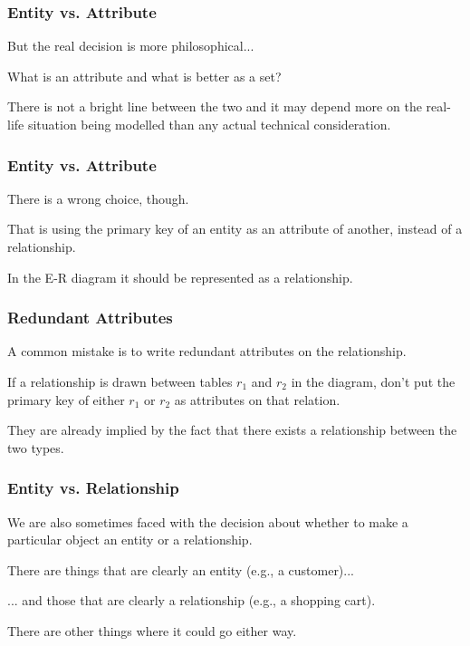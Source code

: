 \begin{frame}
\frametitle{Entity vs. Attribute}

But the real decision is more philosophical... 

What is an attribute and what is better as a set? 

There is not a bright line between the two and it may depend more on the real-life situation being modelled than any actual technical consideration.


\end{frame}



\begin{frame}
\frametitle{Entity vs. Attribute}

There is a wrong choice, though. 

That is using the primary key of an entity as an attribute of another, instead of a relationship. 

In the E-R diagram it should be represented as a relationship.

\end{frame}



\begin{frame}
\frametitle{Redundant Attributes}

A common mistake is to write redundant attributes on the relationship. 

If a relationship is drawn between tables $r_{1}$ and $r_{2}$ in the diagram, don't put the primary key of either $r_{1}$ or $r_{2}$ as attributes on that relation.

They are already implied by the fact that there exists a relationship between the two types. 

\end{frame}



\begin{frame}
\frametitle{Entity vs. Relationship}

We are also sometimes faced with the decision about whether to make a particular object an entity or a relationship. 

There are things that are clearly an entity (e.g., a customer)...

... and those that are clearly a relationship (e.g., a shopping cart).

There are other things where it could go either way. 

\end{frame}



